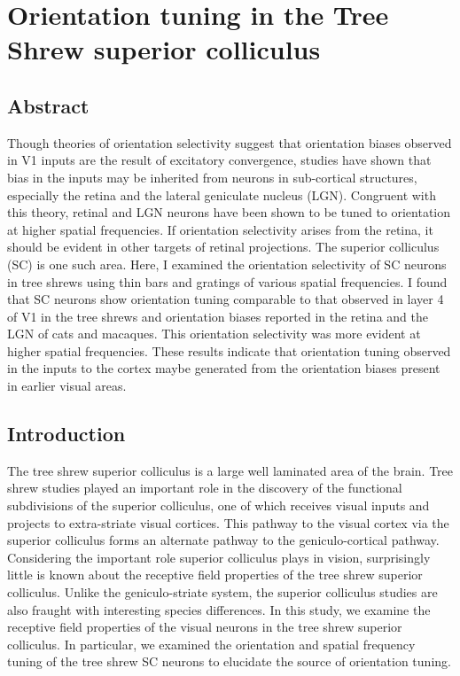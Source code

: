 \documentclass [12pt]{report}
\begin{document}
\chapter{Orientation tuning in the Tree Shrew superior colliculus}
\pagebreak
\section{Abstract}

Though theories of orientation selectivity suggest that orientation biases observed in V1 inputs are the result of excitatory convergence, studies have shown that bias in the inputs may be inherited from neurons in sub-cortical structures, especially the retina and the lateral geniculate nucleus (LGN). Congruent with this theory, retinal and LGN neurons have been shown to be tuned to orientation at higher spatial frequencies. If orientation selectivity arises from the retina, it should be evident in other targets of retinal projections. The superior colliculus (SC) is one such area. Here, I examined the orientation selectivity of SC neurons in tree shrews using thin bars and gratings of various spatial frequencies. I found that SC neurons show orientation tuning comparable to that observed in layer 4 of V1 in the tree shrews and orientation biases reported in the retina and the LGN of cats and macaques. This orientation selectivity was more evident at higher spatial frequencies. These results indicate that orientation tuning observed in the inputs to the cortex maybe generated from the orientation biases present in earlier visual areas.
\pagebreak
\section{Introduction}

The tree shrew superior colliculus is a large well laminated area of the brain. Tree shrew studies played an important role in the discovery of the functional subdivisions of the superior colliculus, one of which receives visual inputs and projects to extra-striate visual cortices. This pathway to the visual cortex via the superior colliculus forms an alternate pathway to the geniculo-cortical pathway. Considering the important role superior colliculus plays in vision, surprisingly little is known about the receptive field properties of the tree shrew superior colliculus. Unlike the geniculo-striate system, the superior colliculus studies are also fraught with interesting species differences. In this study, we examine the receptive field properties of the visual neurons in the tree shrew superior colliculus. In particular, we examined the orientation and spatial frequency tuning of the tree shrew SC neurons to elucidate the source of orientation tuning.
\end{document}
